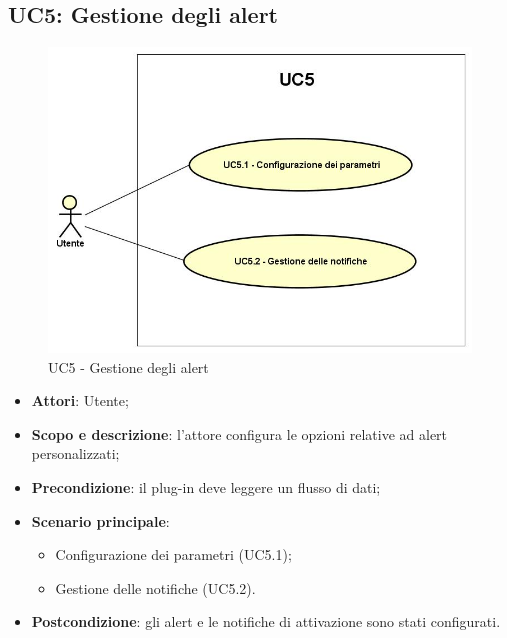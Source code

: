 \subsection{UC5: Gestione degli alert}
\hypertarget{UC5}{}
\begin{figure} [H]
	\centering
	\includegraphics[scale=0.45]{Img/UC5}
	\caption{UC5 - Gestione degli alert}\label{}
\end{figure}
\begin{itemize}
	\item \textbf{Attori}: Utente;
	\item \textbf{Scopo e descrizione}: l'attore configura le opzioni relative ad alert personalizzati;
	\item \textbf{Precondizione}: il plug-in deve leggere un flusso di dati;
	\item \textbf{Scenario principale}:
	\begin{itemize}
		\item Configurazione dei parametri (UC5.1);
		\item Gestione delle notifiche (UC5.2).
	\end{itemize}
	\item \textbf{Postcondizione}: gli alert e le notifiche di attivazione sono stati configurati.
\end{itemize}

